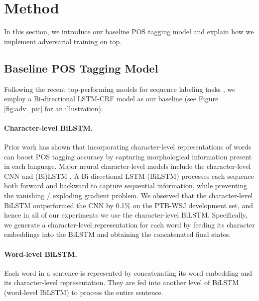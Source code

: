 \documentclass[11pt,a4paper]{article}
\begin{document}
\section{Method}
In this section, we introduce our baseline POS tagging model and explain how we implement adversarial training on top.

\subsection{Baseline POS Tagging Model}
Following the recent top-performing models for sequence labeling tasks \cite{plank2016multilingual,Lample2016ner,ma-hovy:2016:P16-1},
we employ a Bi-directional LSTM-CRF model as our baseline (see Figure \ref{fig:adv_pic} for an illustration).


\paragraph{Character-level BiLSTM.}
Prior work has shown that incorporating character-level representations of words can boost POS tagging accuracy by capturing morphological information present in each language.
Major neural character-level models 
include the character-level CNN \cite{ma-hovy:2016:P16-1} and (Bi)LSTM \cite{dozat-qi-manning:2017:K17-3}.
A Bi-directional LSTM (BiLSTM) \cite{Hochreiter:1997:LSM:1246443.1246450,Schuster:1997:BRN:2198065.2205129} processes each sequence both forward and backward to capture sequential information,
while preventing the vanishing \!/\! exploding gradient problem.
We observed that the character-level BiLSTM outperformed the CNN by 0.1\% on the PTB-WSJ development set, and hence in all of our experiments
we use the character-level BiLSTM.
Specifically, we generate a character-level representation for each word
by feeding its character embeddings into the BiLSTM and obtaining the 
concatenated final states.

\paragraph{Word-level BiLSTM.}

Each word in a sentence is represented by concatenating its word embedding and its character-level representation.
They are %
fed into another level of BiLSTM (word-level BiLSTM) to process the entire sentence.
\end{document}
